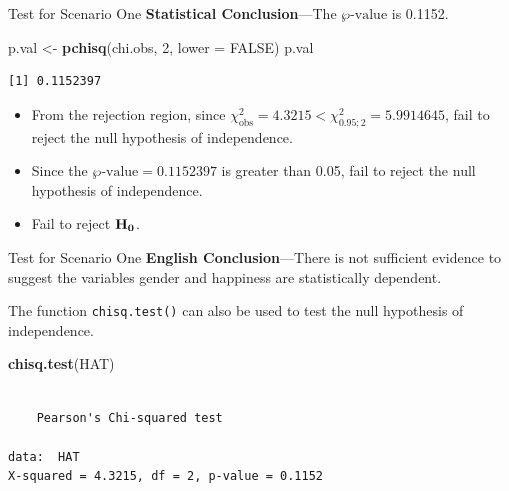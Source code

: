 \documentclass[
  ignorenonframetext,
]{beamer}
\newenvironment{Shaded}{\begin{snugshade}}{\end{snugshade}}
\newcommand{\AttributeTok}[1]{\textcolor[rgb]{0.13,0.29,0.53}{#1}}
\newcommand{\ConstantTok}[1]{\textcolor[rgb]{0.56,0.35,0.01}{#1}}
\newcommand{\DecValTok}[1]{\textcolor[rgb]{0.00,0.00,0.81}{#1}}
\newcommand{\FunctionTok}[1]{\textcolor[rgb]{0.13,0.29,0.53}{\textbf{#1}}}
\newcommand{\NormalTok}[1]{#1}
\newcommand{\OtherTok}[1]{\textcolor[rgb]{0.56,0.35,0.01}{#1}}
\begin{document}
\begin{frame}[fragile]{Test for Scenario One}
\protect\hypertarget{test-for-scenario-one-5}{}
\textbf{Statistical Conclusion}---The \(\wp\text{-value}\) is 0.1152.

\begin{Shaded}
\begin{Highlighting}[]
\NormalTok{p.val }\OtherTok{\textless{}{-}} \FunctionTok{pchisq}\NormalTok{(chi.obs, }\DecValTok{2}\NormalTok{, }\AttributeTok{lower =} \ConstantTok{FALSE}\NormalTok{)}
\NormalTok{p.val}
\end{Highlighting}
\end{Shaded}

\begin{verbatim}
[1] 0.1152397
\end{verbatim}

\begin{itemize}
\item
  From the rejection region, since
  \(\chi_{\text{obs}}^2=4.3215 < \chi^2_{0.95;2}=5.9914645\), fail to
  reject the null hypothesis of independence.
\item
  Since the \(\wp\text{-value}= 0.1152397\) is greater than 0.05, fail
  to reject the null hypothesis of independence.
\item
  Fail to reject \({\bf H_0}\).
\end{itemize}
\end{frame}

\begin{frame}[fragile]{Test for Scenario One}
\protect\hypertarget{test-for-scenario-one-6}{}
\textbf{English Conclusion}---There is not sufficient evidence to
suggest the variables gender and happiness are statistically dependent.

The function \texttt{chisq.test()} can also be used to test the null
hypothesis of independence.

\begin{Shaded}
\begin{Highlighting}[]
\FunctionTok{chisq.test}\NormalTok{(HAT)}
\end{Highlighting}
\end{Shaded}

\begin{verbatim}

    Pearson's Chi-squared test

data:  HAT
X-squared = 4.3215, df = 2, p-value = 0.1152
\end{verbatim}
\end{frame}
\end{document}
